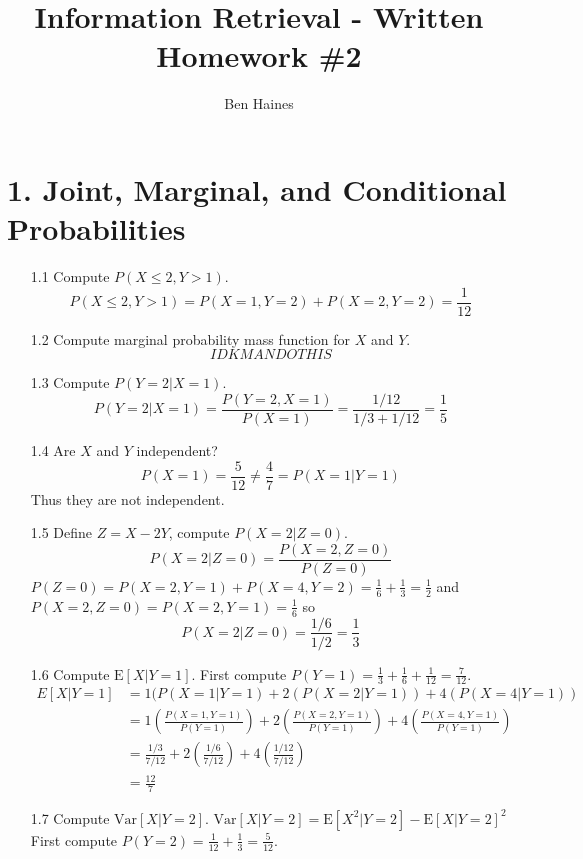 \documentclass[paper=a4, fontsize=11pt]{jhwhw} %
\begin{document}
\title{Information Retrieval - Written Homework \#2}
\author{Ben Haines}

\section*{1. Joint, Marginal, and Conditional Probabilities} 
\begin{enumerate}
    \item [1.1] Compute $P(X \le 2, Y > 1)$.
        $$P(X \le 2, Y > 1) = P(X = 1, Y = 2) + P(X = 2, Y = 2) = \frac{1}{12}$$
    \item [1.2] Compute marginal probability mass function for $X$ and $Y$.
        $$IDK MAN DO THIS$$
    \item [1.3] Compute $P(Y = 2|X = 1)$.
        $$P(Y = 2|X = 1) = \frac{P(Y = 2, X = 1)}{P(X = 1)} = \frac{1/12}{1/3 + 1/12} = \frac{1}{5}$$
    \item [1.4] Are $X$ and $Y$ independent?\\
        $$P(X = 1) = \frac{5}{12} \not= \frac{4}{7} = P(X = 1|Y = 1)$$
        Thus they are not independent.
    \item [1.5] Define $Z = X - 2Y$, compute $P(X = 2|Z = 0)$. 
        $$P(X = 2|Z = 0) = \frac{P(X = 2, Z = 0)}{P(Z = 0)}$$
        $P(Z = 0) = P(X = 2, Y = 1) + P(X = 4, Y = 2) = \frac{1}{6} + \frac{1}{3} = \frac{1}{2}$ and
        $P(X = 2, Z = 0) = P(X = 2, Y = 1) = \frac{1}{6}$ so 
        $$P(X = 2|Z = 0) = \frac{1/6}{1/2} = \frac{1}{3}$$
    \item [1.6] Compute $\mathrm{E}[X|Y = 1]$.
        First compute $P(Y = 1) = \frac{1}{3} + \frac{1}{6} + \frac{1}{12} = \frac{7}{12}$.
        \begin{align*}
            E[X|Y = 1] &= 1(P(X = 1|Y = 1) + 2(P(X = 2| Y = 1)) + 4(P(X = 4|Y = 1))\\
                       &= 1(\frac{P(X = 1, Y = 1)}{P(Y = 1)}) + 2(\frac{P(X = 2, Y = 1)}{P(Y = 1)}) + 4(\frac{P(X = 4, Y = 1)}{P(Y = 1)})\\
                       &= \frac{1/3}{7/12} + 2(\frac{1/6}{7/12}) + 4(\frac{1/12}{7/12})\\
                       &= \frac{12}{7}
        \end{align*}
    \item [1.7] Compute $\mathrm{Var}[X|Y = 2]$.
        $\mathrm{Var}[X|Y = 2] = \mathrm{E}[X^2|Y = 2] - \mathrm{E}[X|Y = 2]^2$
        First compute $P(Y = 2) = \frac{1}{12} + \frac{1}{3} = \frac{5}{12}$.
        \begin{align*}

\end{align*}
\end{enumerate}
\end{document}
